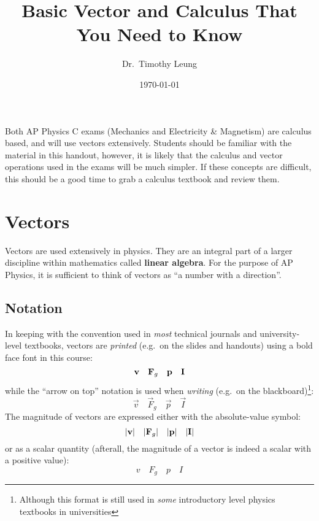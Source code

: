 \documentclass{../../../oss-handout}
\title{Basic Vector and Calculus That You Need to Know}
\author{Dr.\ Timothy Leung}
\date{\today}
\newcommand{\mb}[1]{\ensuremath\mathbf{#1}}
\begin{document}
\thispagestyle{title}
\gentitle


Both AP Physics C exams (Mechanics and Electricity \& Magnetism) are calculus
based, and will use vectors extensively.
Students should be familiar with the material in this handout, however, it is
likely that the calculus and vector operations used in the exams will be much
simpler. If these concepts are difficult, this should be a good time to grab a
calculus textbook and review them.

\section{Vectors}
Vectors are used extensively in physics. They are an integral part of a larger
discipline within mathematics called \textbf{linear algebra}. For the purpose
of AP Physics, it is sufficient to think of vectors as
``a number with a direction''.

\subsection{Notation}
In keeping with the convention used in \emph{most} technical journals and
university-level textbooks, vectors are \emph{printed} (e.g.\ on the slides and
handouts) using a bold face font in this course:
\begin{equation*}
  \mb{v}\quad\mb{F}_g\quad\mb{p}\quad\mb{I}
\end{equation*}
while the ``arrow on top'' notation is used when \emph{writing} (e.g.\ on the
blackboard)\footnote{Although this format is still used in \emph{some}
  introductory level physics textbooks in universities}:
\begin{equation*}
  \vec{v}\quad\vec{F}_g\quad\vec{p}\quad\vec{I}
\end{equation*}
The magnitude of vectors are expressed either with the absolute-value symbol:
\begin{equation*}
  |\mb{v}|\quad|\mb{F}_g|\quad|\mb{p}|\quad|\mb{I}|
\end{equation*}
or as a scalar quantity (afterall, the magnitude of a vector is indeed a scalar
with a positive value):
\begin{equation*}
  v\quad F_g\quad p \quad I
\end{equation*}
\end{document}
